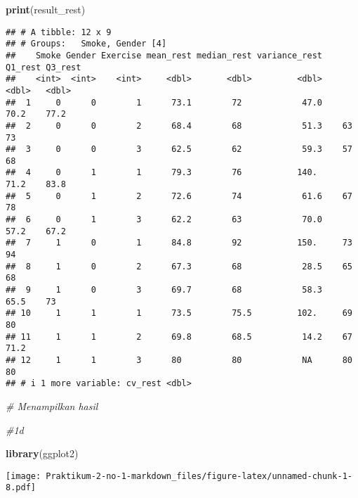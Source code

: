 \documentclass[
]{article}
\newenvironment{Shaded}{\begin{snugshade}}{\end{snugshade}}
\newcommand{\CommentTok}[1]{\textcolor[rgb]{0.56,0.35,0.01}{\textit{#1}}}
\newcommand{\FunctionTok}[1]{\textcolor[rgb]{0.13,0.29,0.53}{\textbf{#1}}}
\newcommand{\NormalTok}[1]{#1}
\begin{document}
\begin{Shaded}
\begin{Highlighting}[]
\FunctionTok{print}\NormalTok{(result\_rest)}
\end{Highlighting}
\end{Shaded}

\begin{verbatim}
## # A tibble: 12 x 9
## # Groups:   Smoke, Gender [4]
##    Smoke Gender Exercise mean_rest median_rest variance_rest Q1_rest Q3_rest
##    <int>  <int>    <int>     <dbl>       <dbl>         <dbl>   <dbl>   <dbl>
##  1     0      0        1      73.1        72            47.0    70.2    77.2
##  2     0      0        2      68.4        68            51.3    63      73  
##  3     0      0        3      62.5        62            59.3    57      68  
##  4     0      1        1      79.3        76           140.     71.2    83.8
##  5     0      1        2      72.6        74            61.6    67      78  
##  6     0      1        3      62.2        63            70.0    57.2    67.2
##  7     1      0        1      84.8        92           150.     73      94  
##  8     1      0        2      67.3        68            28.5    65      68  
##  9     1      0        3      69.7        68            58.3    65.5    73  
## 10     1      1        1      73.5        75.5         102.     69      80  
## 11     1      1        2      69.8        68.5          14.2    67      71.2
## 12     1      1        3      80          80            NA      80      80  
## # i 1 more variable: cv_rest <dbl>
\end{verbatim}

\begin{Shaded}
\begin{Highlighting}[]
\CommentTok{\# Menampilkan hasil}

\CommentTok{\#1d}

\FunctionTok{library}\NormalTok{(ggplot2)}
\end{Highlighting}
\end{Shaded}

\texttt{[image: Praktikum-2-no-1-markdown\_files/figure-latex/unnamed-chunk-1-8.pdf]}
\end{document}

